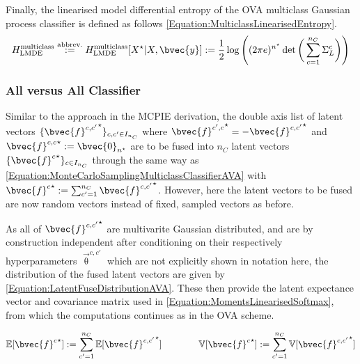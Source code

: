 				Finally, the linearised model differential entropy of the OVA multiclass Gaussian process classifier is defined as follows \eqref{Equation:MulticlassLinearisedEntropy}. \begin{equation}
					H^{\mathrm{multiclass}}_{\mathrm{LMDE}} \stackrel{\text{abbrev.}}{:=} H^{\mathrm{multiclass}}_{\mathrm{LMDE}}[X^{\star} | X, \bvec{y}] := \frac{1}{2} \log\Bigg((2 \pi e)^{n^{\star}} \det\bigg(\sum_{c = 1}^{n_{C}} \Sigma^{c}_{L}\bigg)\Bigg)
				\label{Equation:MulticlassLinearisedEntropy}
				\end{equation}

			\subsubsection{All versus All Classifier}
			\label{InformativeSeafloorExploration:LMDE:Multiclass:AVA}
					
				Similar to the approach in the MCPIE derivation, the double axis list of latent vectors $\{ {\bvec{f}^{c, c'}}^{\star} \}_{c, c' \in I_{n_{C}}}$ where ${\bvec{f}^{c', c}}^{\star} = - {\bvec{f}^{c, c'}}^{\star}$ and ${\bvec{f}^{c, c}}^{\star} := \bvec{0}_{n^{\star}}$  are to be fused into $n_{C}$ latent vectors $\{ {\bvec{f}^{c}}^{\star} \}_{c \in I_{n_{C}}}$ through the same way as \eqref{Equation:MonteCarloSamplingMulticlassClassifierAVA} with ${\bvec{f}^{c}}^{\star} := \sum_{c' = 1}^{n_{C}} {\bvec{f}^{c, c'}}^{\star}$. However, here the latent vectors to be fused are now random vectors instead of fixed, sampled vectors as before. 
			
				As all of ${\bvec{f}^{c, c'}}^{\star}$ are multivarite Gaussian distributed, and are by construction independent after conditioning on their respectively hyperparameters $\vec{\uptheta}^{c, c'}$ which are not explicitly shown in notation here, the distribution of the fused latent vectors are given by \eqref{Equation:LatentFuseDistributionAVA}. These then provide the latent expectance vector and covariance matrix used in \eqref{Equation:MomentsLinearisedSoftmax}, from which the computations continues as in the OVA scheme.
				
				\begin{equation}
					\begin{aligned}
						\mathbb{E}[{\bvec{f}^{c}}^{\star}] := \sum_{c' = 1}^{n_{C}} \mathbb{E}[{\bvec{f}^{c, c'}}^{\star}] \qquad \qquad \mathbb{V}[{\bvec{f}^{c}}^{\star}] := \sum_{c' = 1}^{n_{C}} \mathbb{V}[{\bvec{f}^{c, c'}}^{\star}]
					\end{aligned}
				\label{Equation:LatentFuseDistributionAVA}
				\end{equation}
				

